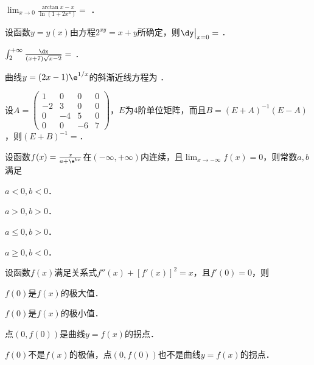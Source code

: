 \documentclass[plain,noanswer,medmath]{../../template/jnuexam}
\begin{document}






\begin{problem}
$\lim_{x \to 0} \frac{\arctan x - x}{\ln(1 + 2x^3)} =$ \fillin{}．
\end{problem}


\begin{problem}
设函数$y = y(x)$由方程$2^{xy} = x + y$所确定，则$\dy\big|_{x = 0} =$ \fillin{}．
\end{problem}


\begin{problem}
$\int_2^{+\infty} \frac{\dx}{(x + 7)\sqrt{x - 2}} =$ \fillin{}．
\end{problem}


\begin{problem}
曲线$y = (2x - 1)\e^{1/x}$的斜渐近线方程为 \fillin{}．
\end{problem}


\begin{problem}
设$A = \begin{pmatrix}
   1 &  0 &  0 & 0 \\
  -2 &  3 &  0 & 0 \\
   0 & -4 &  5 & 0 \\
   0 &  0 & -6 & 7
\end{pmatrix}$，$E$为$4$阶单位矩阵，而且$B = (E + A)^{-1}(E - A)$，则$(E + B)^{-1}=$\fillin{}．
\end{problem}




\begin{problem}
设函数$f(x) = \frac{x}{a + \e^{bx}}$在$(-\infty , +\infty)$内连续，且$\lim_{x \to -\infty} f(x) = 0$，则常数$a,b$满足 \pickout{}
\begin{abcd}
\item $a < 0,b < 0$．
\item $a > 0,b > 0$．
\item $a \le 0,b > 0$．
\item $a \ge 0,b < 0$．
\end{abcd}
\end{problem}


\begin{problem}
设函数$f(x)$满足关系式$f''(x) + [f'(x)]^2 = x$，且$f'(0) = 0$，则\pickout{}
\begin{abcd}
\item $f(0)$是$f(x)$的极大值．
\item $f(0)$是$f(x)$的极小值．
\item 点$(0,f(0))$是曲线$y = f(x)$的拐点．
\item $f(0)$不是$f(x)$的极值，点$(0,f(0))$也不是曲线$y = f(x)$的拐点．
\end{abcd}
\end{problem}
\end{document}
